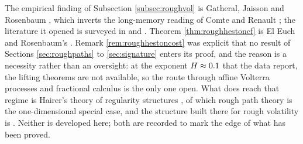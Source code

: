 \noindent
The empirical finding of Subsection \ref{subsec:roughvol} is Gatheral, Jaisson and Rosenbaum
\cite{gatheraljaissonrosenbaum2018}, which inverts the long-memory reading of Comte and Renault
\cite{comterenault1998}; the literature it opened is surveyed in \cite{bayerfrizfukasawa2023} and
\cite{dinunno2023}. Theorem \ref{thm:roughhestoncf} is El Euch and Rosenbaum's
\cite{eleucrosenbaum2019}. Remark \ref{rem:roughhestoncost} was explicit that no result of Sections
\ref{sec:roughpaths} to \ref{sec:signature} enters its proof, and the reason is a necessity rather
than an oversight: at the exponent $H\approx0.1$ that the data report, the lifting theorems are
not available, so the route through affine Volterra processes and fractional calculus is the only
one open. What does reach that regime is Hairer's theory of regularity structures
\cite{hairer2014}, of which rough path theory is the one-dimensional special case, and the structure
built there for rough volatility is \cite{bayerfrizgassiat2020}. Neither is developed here; both are
recorded to mark the edge of what has been proved.


